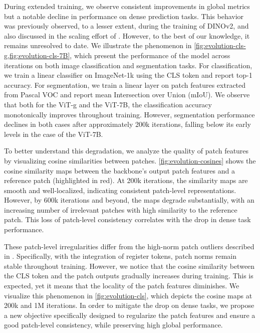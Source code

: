 During extended training, we observe consistent improvements in global metrics but a notable decline in performance on dense prediction tasks. 
This behavior was previously observed, to a lesser extent, during the training of DINOv2, and also discussed in the scaling effort of \citet{fan2025scaling}.
However, to the best of our knowledge, it remains unresolved to date.
We illustrate the phenomenon in \cref{fig:evolution-cls-g,fig:evolution-cls-7B}, which present the performance of the model across iterations on both image classification and segmentation tasks. 
For classification, we train a linear classifier on ImageNet-1k using the CLS token and report top-1 accuracy. 
For segmentation, we train a linear layer on patch features extracted from Pascal VOC and report mean Intersection over Union (mIoU). 
We observe that both for the ViT-g and the ViT-7B, the classification accuracy monotonically improves throughout training. 
However, segmentation performance declines in both cases after approximately 200k iterations, falling below its early levels in the case of the ViT-7B.

To better understand this degradation, we analyze the quality of patch features by visualizing cosine similarities between patches. \cref{fig:evolution-cosines} shows the cosine similarity maps between the backbone’s output patch features and a reference patch (highlighted in red). At 200k iterations, the similarity maps are smooth and well-localized, indicating consistent patch-level representations. However, by 600k iterations and beyond, the maps degrade substantially,  with an increasing number of irrelevant patches with high similarity to the reference patch. 
This loss of patch-level consistency correlates with the drop in dense task performance.

These patch-level irregularities differ from the high-norm patch outliers described in \citet{darcet2024vision}. 
Specifically, with the integration of register tokens, patch norms remain stable throughout training. However, we notice that the cosine similarity between the CLS token and the patch outputs gradually increases during training. This is expected, yet it means that the locality of the patch features diminishes. We visualize this phenomenon in \cref{fig:evolution-cls}, which depicts the cosine maps at 200k and 1M iterations. 
In order to mitigate the drop on dense tasks, we propose a new objective specifically designed to regularize the patch features and ensure a good patch-level consistency, while preserving high global performance.












